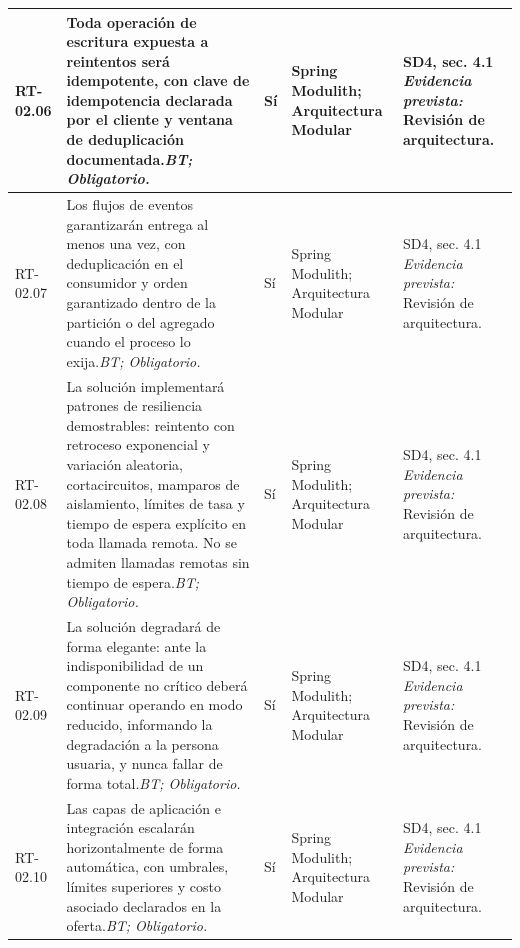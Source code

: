 \begin{paginaHorizontalSynaptix}
\begin{longtable}{|L{0.09\AnchoMatrizTDoce}|L{0.385\AnchoMatrizTDoce}|L{0.065\AnchoMatrizTDoce}|L{0.18\AnchoMatrizTDoce}|L{0.28\AnchoMatrizTDoce}|}
RT-\allowbreak{}02.\allowbreak{}06 &
Toda operación de escritura expuesta a reintentos será idempotente, con clave de idempotencia declarada por el cliente y ventana de deduplicación documentada.\newline\textit{BT; Obligatorio.} &
Sí &
Spring Modulith; Arquitectura Modular &
SD4, sec. 4.1 \newline\textit{Evidencia prevista:} Revisión de arquitectura. \\ \hline

RT-\allowbreak{}02.\allowbreak{}07 &
Los flujos de eventos garantizarán entrega al menos una vez, con deduplicación en el consumidor y orden garantizado dentro de la partición o del agregado cuando el proceso lo exija.\newline\textit{BT; Obligatorio.} &
Sí &
Spring Modulith; Arquitectura Modular &
SD4, sec. 4.1 \newline\textit{Evidencia prevista:} Revisión de arquitectura. \\ \hline

RT-\allowbreak{}02.\allowbreak{}08 &
La solución implementará patrones de resiliencia demostrables: reintento con retroceso exponencial y variación aleatoria, cortacircuitos, mamparos de aislamiento, límites de tasa y tiempo de espera explícito en toda llamada remota. No se admiten llamadas remotas sin tiempo de espera.\newline\textit{BT; Obligatorio.} &
Sí &
Spring Modulith; Arquitectura Modular &
SD4, sec. 4.1 \newline\textit{Evidencia prevista:} Revisión de arquitectura. \\ \hline

RT-\allowbreak{}02.\allowbreak{}09 &
La solución degradará de forma elegante: ante la indisponibilidad de un componente no crítico deberá continuar operando en modo reducido, informando la degradación a la persona usuaria, y nunca fallar de forma total.\newline\textit{BT; Obligatorio.} &
Sí &
Spring Modulith; Arquitectura Modular &
SD4, sec. 4.1 \newline\textit{Evidencia prevista:} Revisión de arquitectura. \\ \hline

RT-\allowbreak{}02.\allowbreak{}10 &
Las capas de aplicación e integración escalarán horizontalmente de forma automática, con umbrales, límites superiores y costo asociado declarados en la oferta.\newline\textit{BT; Obligatorio.} &
Sí &
Spring Modulith; Arquitectura Modular &
SD4, sec. 4.1 \newline\textit{Evidencia prevista:} Revisión de arquitectura. \\ \hline


\end{longtable}
\end{paginaHorizontalSynaptix}
